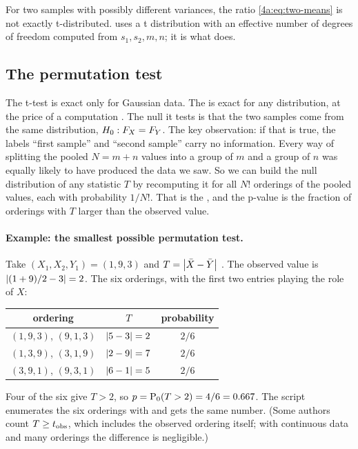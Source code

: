 For two samples with possibly different variances, the ratio
\eqref{4a:eq:two-means} is not exactly t-distributed. 
uses a t distribution with an effective number of degrees of freedom computed
from $s_1,s_2,m,n$; it is what 
does.

\subsection{The permutation test}
\label{4a:sec:permutation}

The t-test is exact only for Gaussian data. The 
is exact for any distribution, at the price of a computation
. The null it tests is that the two samples come from the
same distribution, $H_0:F_X=F_Y$. The key observation: if that is true, the
labels ``first sample'' and ``second sample'' carry no information. Every way
of splitting the pooled $N=m+n$ values into a group of $m$ and a group of $n$
was equally likely to have produced the data we saw. So we can build the null
distribution of any statistic $T$ by recomputing it for all $N!$ orderings of
the pooled values, each with probability $1/N!$. That is the
, and the p-value is the fraction of
orderings with $T$ larger than the observed value.

\paragraph{Example: the smallest possible permutation test.}
Take $(X_1,X_2,Y_1)=(1,9,3)$ and $T=\left\lvert \bar X-\bar Y\right\rvert$
. The observed value is $\left\lvert (1+9)/2-3\right\rvert=2$. The six
orderings, with the first two entries playing the role of $X$:
\begin{center}
\begin{tabular}{ccc}
\toprule
ordering & $T$ & probability \\
\midrule
$(1,9,3)$, $(9,1,3)$ & $\left\lvert 5-3\right\rvert=2$ & $2/6$ \\
$(1,3,9)$, $(3,1,9)$ & $\left\lvert 2-9\right\rvert=7$ & $2/6$ \\
$(3,9,1)$, $(9,3,1)$ & $\left\lvert 6-1\right\rvert=5$ & $2/6$ \\
\bottomrule
\end{tabular}
\end{center}
Four of the six give $T>2$, so $p=\operatorname{P}_0(T>2)=4/6=0.667$. The script
enumerates the six orderings with  and gets the
same number. (Some authors count $T\ge t_{\rm obs}$, which includes the
observed ordering itself; with continuous data and many orderings the
difference is negligible.)

